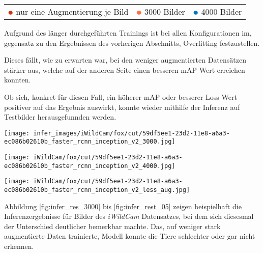 \begin{table}[htb]
  \centering
  \begin{tabular}{ m{}<{\centering}
                   m{}<{\centering}
                   m{}<{\centering}}
      $\color[HTML]{CC3311}\medbullet$ nur eine Augmentierung je Bild &
      $\color[HTML]{FF7043}\medbullet$  3000 Bilder &
      $\color[HTML]{0077BB}\medbullet$  4000 Bilder
  \end{tabular}    
\end{table}
\vspace{1cm}

Aufgrund des länger durchgeführten Trainings
ist bei allen Konfigurationen im, gegensatz zu den
Ergebnissen des vorherigen Abschnitts, Overfitting 
festzustellen.

Dieses fällt, wie zu erwarten war, bei den weniger  
augmentierten Datensätzen stärker aus, welche auf der 
anderen Seite einen besseren mAP Wert erreichen konnten.

Ob sich, konkret für diesen Fall, ein höherer mAP oder 
besserer Loss Wert positiver auf das Ergebnis auswirkt,
konnte wieder mithilfe der Inferenz auf Testbilder 
herausgefunnden werden.

\vspace{1cm}
\begin{minipage}{0.333\textwidth}
  \centering
  \texttt{[image: infer\_images/iWildCam/fox/cut/59df5ee1-23d2-11e8-a6a3-ec086b02610b\_faster\_rcnn\_inception\_v2\_3000.jpg]}
  \label{fig:infer_res_3000}
\end{minipage}
\begin{minipage}{0.333\textwidth}
  \centering
  \label{fig:infer_res_4000}
  \texttt{[image: iWildCam/fox/cut/59df5ee1-23d2-11e8-a6a3-ec086b02610b\_faster\_rcnn\_inception\_v2\_4000.jpg]}
\end{minipage}
\begin{minipage}{0.333\textwidth}
  \centering
  \texttt{[image: iWildCam/fox/cut/59df5ee1-23d2-11e8-a6a3-ec086b02610b\_faster\_rcnn\_inception\_v2\_less\_aug.jpg]}
  \label{fig:infer_rest_05}
\end{minipage}
\vspace{1cm}

Abbildung \ref{fig:infer_res_3000} bis \ref{fig:infer_rest_05}
zeigen beispielhaft die Inferenzergebnisse für Bilder des 
\textit{iWildCam} Datensatzes, bei dem sich diesesmal der 
Unterschied deutlicher bemerkbar machte.
Das, auf weniger stark augmentierte Daten trainierte, 
Modell konnte die Tiere schlechter oder gar nicht erkennen.


